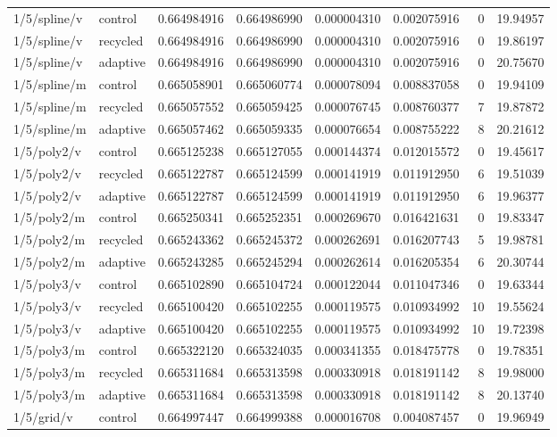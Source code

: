 \begin{longtable}{llrrrrrr}
1/5/spline/v & control & 0.664984916 & 0.664986990 & 0.000004310 & 0.002075916 & 0 & 19.94957 \\
1/5/spline/v & recycled & 0.664984916 & 0.664986990 & 0.000004310 & 0.002075916 & 0 & 19.86197 \\
1/5/spline/v & adaptive & 0.664984916 & 0.664986990 & 0.000004310 & 0.002075916 & 0 & 20.75670 \\
1/5/spline/m & control & 0.665058901 & 0.665060774 & 0.000078094 & 0.008837058 & 0 & 19.94109 \\
1/5/spline/m & recycled & 0.665057552 & 0.665059425 & 0.000076745 & 0.008760377 & 7 & 19.87872 \\
1/5/spline/m & adaptive & 0.665057462 & 0.665059335 & 0.000076654 & 0.008755222 & 8 & 20.21612 \\
1/5/poly2/v & control & 0.665125238 & 0.665127055 & 0.000144374 & 0.012015572 & 0 & 19.45617 \\
1/5/poly2/v & recycled & 0.665122787 & 0.665124599 & 0.000141919 & 0.011912950 & 6 & 19.51039 \\
1/5/poly2/v & adaptive & 0.665122787 & 0.665124599 & 0.000141919 & 0.011912950 & 6 & 19.96377 \\
1/5/poly2/m & control & 0.665250341 & 0.665252351 & 0.000269670 & 0.016421631 & 0 & 19.83347 \\
1/5/poly2/m & recycled & 0.665243362 & 0.665245372 & 0.000262691 & 0.016207743 & 5 & 19.98781 \\
1/5/poly2/m & adaptive & 0.665243285 & 0.665245294 & 0.000262614 & 0.016205354 & 6 & 20.30744 \\
1/5/poly3/v & control & 0.665102890 & 0.665104724 & 0.000122044 & 0.011047346 & 0 & 19.63344 \\
1/5/poly3/v & recycled & 0.665100420 & 0.665102255 & 0.000119575 & 0.010934992 & 10 & 19.55624 \\
1/5/poly3/v & adaptive & 0.665100420 & 0.665102255 & 0.000119575 & 0.010934992 & 10 & 19.72398 \\
1/5/poly3/m & control & 0.665322120 & 0.665324035 & 0.000341355 & 0.018475778 & 0 & 19.78351 \\
1/5/poly3/m & recycled & 0.665311684 & 0.665313598 & 0.000330918 & 0.018191142 & 8 & 19.98000 \\
1/5/poly3/m & adaptive & 0.665311684 & 0.665313598 & 0.000330918 & 0.018191142 & 8 & 20.13740 \\
1/5/grid/v & control & 0.664997447 & 0.664999388 & 0.000016708 & 0.004087457 & 0 & 19.96949 \\

\end{longtable}
